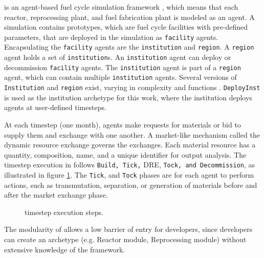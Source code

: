 \Cyclus is an agent-based fuel cycle simulation framework 
\cite{huff_fundamental_2016}, which means 
that each reactor, reprocessing plant, and fuel fabrication plant is modeled as an agent.
A \Cyclus simulation contains prototypes, which are fuel cycle facilities with
pre-defined parameters, that are deployed in the simulation as \texttt{facility} agents.
Encapsulating the \texttt{facility} agents are the \texttt{institution} and \texttt{region}.
A \texttt{region} agent holds a set of \texttt{institution}s.
An \texttt{institution} agent can deploy or decommission \texttt{facility} agents.
The \texttt{institution} agent is part of a \texttt{region} agent,
which can contain multiple \texttt{institution} agents. Several versions of \texttt{Institution}
and \texttt{region} exist, varying in complexity and functions \cite{huff_extensions_2014}.
 \texttt{DeployInst} is used as the institution archetype for this work, where the institution
deploys agents at user-defined timesteps.

At each timestep (one month),
agents make requests for materials or bid to supply them and exchange
with one another. A market-like mechanism called the dynamic resource exchange
\cite{gidden_agent-based_2015} governs the exchanges.
Each material resource has a quantity, composition, name, and a unique identifier
for output analysis. The timestep execution in \Cyclus follows 
\texttt{Build, Tick,} \gls{DRE}, \texttt{Tock, and Decommission}, as illustrated in
figure \ref{fig:time}. The \texttt{Tick}, and \texttt{Tock} phases are for
each agent to perform actions, such as transmutation, separation, or generation
of materials before and after the market exchange phase.

\begin{figure}[h]
\centering
{}
\caption{\Cyclus timestep execution steps.}
\label{fig:time}
\end{figure}

The modularity of \Cyclus allows a low barrier of
entry for developers, since developers can create an
archetype (e.g. Reactor module, Reprocessing module)
without extensive knowledge of the \Cyclus framework.
